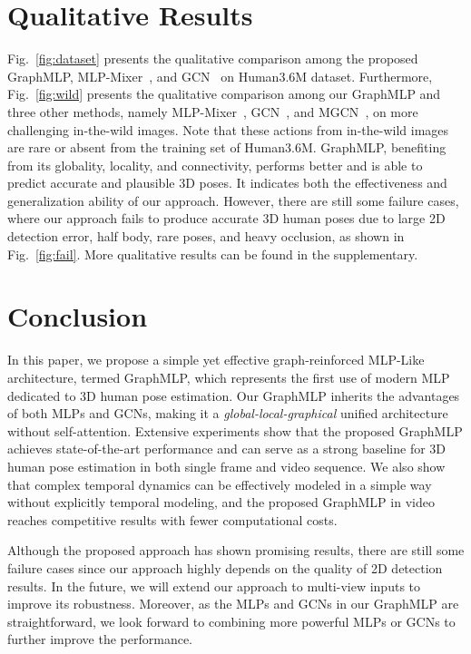 \documentclass[lettersize,journal]{IEEEtran}
\begin{document}
\section{Qualitative Results}
Fig.~\ref{fig:dataset} presents the qualitative comparison among the proposed GraphMLP, MLP-Mixer~\cite{mlpmixer}, and GCN~\cite{stgcn} on Human3.6M dataset. 
Furthermore, Fig.~\ref{fig:wild} presents the qualitative comparison among our GraphMLP and three other methods, namely MLP-Mixer~\cite{mlpmixer}, GCN~\cite{stgcn}, and MGCN~\cite{zou2021modulated}, on more challenging in-the-wild images.
Note that these actions from in-the-wild images are rare or absent from the training set of Human3.6M. 
GraphMLP, benefiting from its globality, locality, and connectivity, performs better and is able to predict accurate and plausible 3D poses. 
It indicates both the effectiveness and generalization ability of our approach. 
However, there are still some failure cases, where our approach fails to produce accurate 3D human poses due to large 2D detection error, half body, rare poses, and heavy occlusion, as shown in Fig.~\ref{fig:fail}. 
More qualitative results can be found in the supplementary. 

\section{Conclusion}
In this paper, we propose a simple yet effective graph-reinforced MLP-Like architecture, termed GraphMLP, which represents the first use of modern MLP dedicated to 3D human pose estimation. 
Our GraphMLP inherits the advantages of both MLPs and GCNs, making it a \textit{global-local-graphical} unified architecture without self-attention. 
Extensive experiments show that the proposed GraphMLP achieves state-of-the-art performance and can serve as a strong baseline for 3D human pose estimation in both single frame and video sequence. 
We also show that complex temporal dynamics can be effectively modeled in a simple way without explicitly temporal modeling, and the proposed GraphMLP in video reaches competitive results with fewer computational costs. 

Although the proposed approach has shown promising results, there are still some failure cases since our approach highly depends on the quality of 2D detection results. 
In the future, we will extend our approach to multi-view inputs to improve its robustness. 
Moreover, as the MLPs and GCNs in our GraphMLP are straightforward, we look forward to combining more powerful MLPs or GCNs to further improve the performance. 
\end{document}
